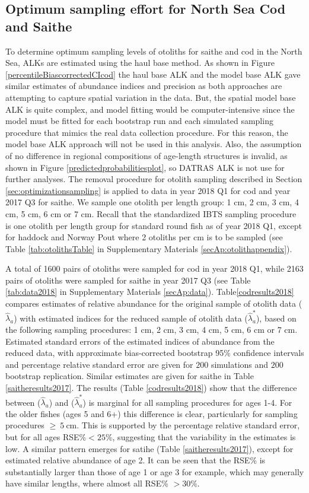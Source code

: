\documentclass[a4paper 12pt]{article}
\numberwithin{equation}{section}
\begin{document}
\subsection{Optimum sampling effort for North Sea Cod and Saithe}
\label{sec:optimumeffortresults}
To determine optimum sampling levels of otoliths for saithe and cod in the North Sea, ALKs are estimated using the haul base  method. As shown in Figure \ref{percentileBiascorrectedCIcod}  the haul base ALK and the model base ALK gave similar estimates of abundance indices and precision as both approaches are attempting to capture spatial variation in the data. But, the spatial model base ALK  is  quite complex, and model fitting would be computer-intensive since the model must be fitted for each bootstrap run and each simulated sampling procedure that mimics the real data collection procedure. For this reason, the model base ALK approach will not be used in this analysis. Also, the assumption of no difference in regional compositions of age-length structures is invalid,  as shown in Figure \ref{predictedprobabilitiesplot},  so DATRAS ALK is not use for further analyses. The removal procedure for otolith sampling described in Section \ref{sec:optimizationsampling} is applied to data in year 2018 Q1 for cod and year 2017 Q3 for saithe. We sample one otolith per length group: 1 cm, 2 cm, 3 cm, 4 cm, 5 cm, 6 cm or 7 cm. Recall that the standardized IBTS sampling procedure is one otolith per length group for standard round fish as of year 2018 Q1, except for haddock and Norway Pout where 2 otoliths per cm is to be sampled (see Table \ref{tab:otolithsTable} in Supplementary Materials \ref{secAp:otolithappendix}). 

A total of 1600 pairs of otoliths were sampled for cod in year 2018 Q1, while 2163 pairs of otoliths were sampled for saithe in year 2017 Q3 (see Table \ref{tab:data2018} in Supplementary Materials \ref{secAp:data}).  Table\ref{codresults2018} compares estimates of relative  abundance for the original sample of otolith data  ($\hat{\lambda}_{a}$) with estimated indices for the reduced sample of otolith data  ($\hat{\lambda}_{a}^{*}$), based on the following sampling procedures: 1 cm, 2 cm, 3 cm, 4 cm, 5 cm, 6 cm or 7 cm. Estimated standard errors of the estimated indices of abundance from the reduced data, with  approximate bias-corrected bootstrap 95\% confidence intervals and percentage relative standard error are given for  $200$ simulations and $200$ bootstrap replication. Similar estimates are given for saithe in Table \ref{saitheresults2017}. The results (Table \ref{codresults2018}) show that the difference between  ($\hat{\lambda}_{a}$) and ($\hat{\lambda}_{a}^{*}$) is marginal for all sampling procedures for ages 1-4. For the older fishes (ages 5 and 6+) this difference is clear, particularly for sampling procedures $\ge \ 5 \ \mathrm{cm}$. This is supported by the percentage relative standard error, but for all ages RSE\%$< 25\%$, suggesting that the variability in the estimates is low. A similar pattern emerges for satihe (Table \ref{saitheresults2017}), except for estimated relative abundance of age 2. It can be seen that the RSE\% is substantially larger than those of age 1 or age 3 for example, which may generally have similar lengths, where almost all RSE\% $>30\%$.    
\end{document}
